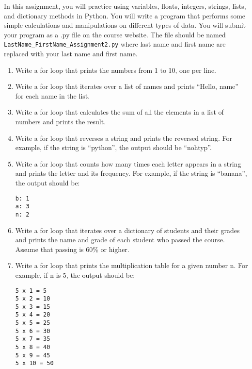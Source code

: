 \documentclass{homework}
\begin{document}
\maketitle

In this assignment, you will practice using variables, floats, integers, strings, lists, and dictionary methods in Python. You will write a program that performs some simple calculations and manipulations on different types of data. You will submit your program as a .py file on the course website. The file should be named \texttt{LastName\_FirstName\_Assignment2.py} where last name and first name are replaced with your last name and first name.\\

\begin{problem}

\begin{enumerate}
\item Write a for loop that prints the numbers from 1 to 10, one per line.
\item Write a for loop that iterates over a list of names and prints “Hello, name” for each name in the list.
\item Write a for loop that calculates the sum of all the elements in a list of numbers and prints the result.
\item Write a for loop that reverses a string and prints the reversed string. For example, if the string is ``python'', the output should be ``nohtyp''.
\item Write a for loop that counts how many times each letter appears in a string and prints the letter and its frequency. For example, if the string is ``banana'', the output should be:
\begin{lstlisting}[style=output]
b: 1
a: 3
n: 2
\end{lstlisting}
\item Write a for loop that iterates over a dictionary of students and their grades and prints the name and grade of each student who passed the course. Assume that passing is 60\% or higher.
\item Write a for loop that prints the multiplication table for a given number n. For example, if n is 5, the output should be:
\begin{lstlisting}[style=output]
5 x 1 = 5
5 x 2 = 10
5 x 3 = 15
5 x 4 = 20
5 x 5 = 25
5 x 6 = 30
5 x 7 = 35
5 x 8 = 40
5 x 9 = 45
5 x 10 = 50
\end{lstlisting}
\end{enumerate}

\end{problem}
\end{document}
